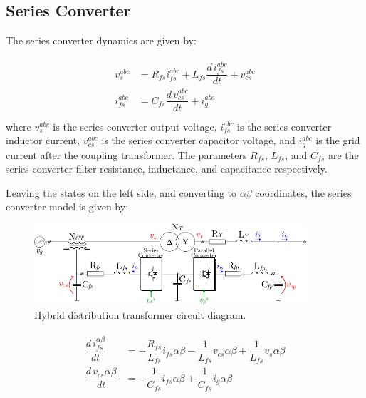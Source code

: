 \subsection{Series Converter}

The series converter dynamics are given by:

\begin{align}
    \begin{aligned}
        v_s^{abc} &= R_{fs}i_{fs}^{abc} + L_{fs}\dfrac{d\,i_{fs}^{abc}}{dt} + v_{cs}^{abc} \\
        i_{fs}^{abc} &= C_{fs}\dfrac{d\,v_{cs}^{abc}}{dt} + i_g^{abc} \\
    \end{aligned}
\end{align}
where $v_s^{abc}$ is the series converter output voltage, $i_{fs}^{abc}$ is the series converter inductor current, $v_{cs}^{abc}$ is the series converter capacitor voltage, and $i_g^{abc}$ is the grid current after the coupling transformer. The parameters $R_{fs}$, $L_{fs}$, and $C_{fs}$ are the series converter filter resistance, inductance, and capacitance respectively.

Leaving the states on the left side, and converting to $\alpha\beta$ coordinates, the series converter model is given by:

\begin{figure}
    \centering
    \includegraphics[width=0.9\textwidth]{Images/HDT_Diagram.pdf} 
    \caption{Hybrid distribution transformer circuit diagram.}
    \label{fig:HDT_Transformer}
\end{figure}

\begin{align}
    \begin{aligned}
        \dfrac{d\,i_{fs}^{\alpha\beta}}{dt} &= -\dfrac{R_{fs}}{L_{fs}}i_{fs}{\alpha\beta} - \dfrac{1}{L_{fs}}v_{cs}{\alpha\beta} + \dfrac{1}{L_{fs}}v_s{\alpha\beta} \\
        \dfrac{d\,v_{cs}{\alpha\beta}}{dt} &= -\dfrac{1}{C_{fs}}i_{fs}{\alpha\beta} + \dfrac{1}{C_{fs}}i_g{\alpha\beta}
    \end{aligned}
\end{align}

